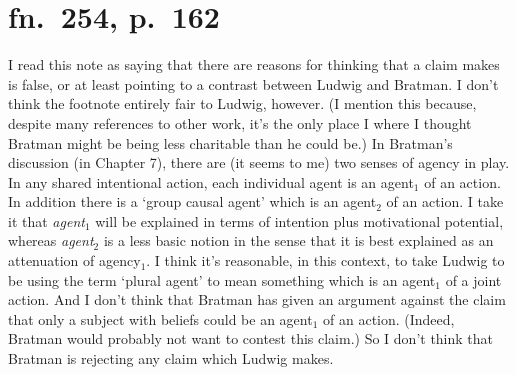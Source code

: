 \documentclass[12pt,letterpaper]{extarticle}
\begin{document}
\setlength\footnotesep{1em}




\maketitle





\section{fn.\ 254, p.\ 162}
I read this note as saying that there are reasons for thinking that a claim \citet{ludwig_collective_2007} makes is false, or at least pointing to a contrast between Ludwig and Bratman.
I don't think the footnote entirely fair to Ludwig, however.
(I mention this because, despite many references to other work, it's the only place I where I thought Bratman might be being less charitable than he could be.)
In Bratman's discussion (in Chapter 7), there are (it seems to me) two senses of agency in play.
In any shared intentional action, each individual agent is an agent$_1$ of an action.
In addition there is a `group causal agent' which is an agent$_2$ of an action.
I take it that \emph{agent$_1$} will be explained in terms of intention plus motivational potential, whereas \emph{agent$_2$} is a less basic notion in the sense that it is best explained as an attenuation of agency$_1$.
I think it's reasonable, in this context, to take Ludwig to be using the term `plural agent' to mean something which is an agent$_1$ of a joint action.
And I don't think that Bratman has given an argument against the claim that only a subject with beliefs could be an agent$_1$ of an action.
(Indeed, Bratman would probably not want to contest this claim.)
So I don't think that Bratman is rejecting any claim which Ludwig makes.
\end{document}
